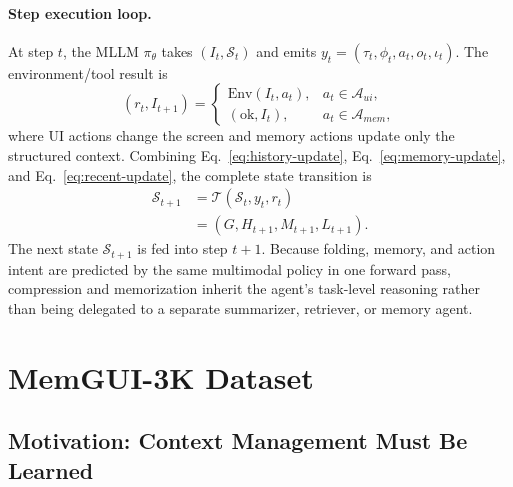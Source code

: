 \documentclass{llmxive}
\begin{document}
\paragraph{Step execution loop.}
At step $t$, the MLLM $\pi_\theta$ takes $(I_t,\mathcal{S}_t)$ and emits $y_t=(\tau_t,\phi_t,a_t,o_t,\iota_t)$. The environment/tool result is
\begin{equation}
\label{eq:tool-result}
(r_t,I_{t+1})=
\begin{cases}
\mathrm{Env}(I_t,a_t), & a_t\in\mathcal{A}_{ui},\\
(\mathrm{ok},I_t), & a_t\in\mathcal{A}_{mem},
\end{cases}
\end{equation}
where UI actions change the screen and memory actions update only the structured context. Combining Eq.~\ref{eq:history-update}, Eq.~\ref{eq:memory-update}, and Eq.~\ref{eq:recent-update}, the complete state transition is
\begin{equation}
\label{eq:state-transition}
\begin{aligned}
\mathcal{S}_{t+1}
&=
\mathcal{T}(\mathcal{S}_t,y_t,r_t)\\
&=
(G,H_{t+1},
M_{t+1},
L_{t+1}).
\end{aligned}
\end{equation}
The next state $\mathcal{S}_{t+1}$ is fed into step $t{+}1$. Because folding, memory, and action intent are predicted by the same multimodal policy in one forward pass, compression and memorization inherit the agent's task-level reasoning rather than being delegated to a separate summarizer, retriever, or memory agent.


\section{MemGUI-3K Dataset}
\label{sec:dataset}
\vspace{-0.25em}

\subsection{Motivation: Context Management Must Be Learned}
\label{sec:dataset-motivation}
\end{document}
